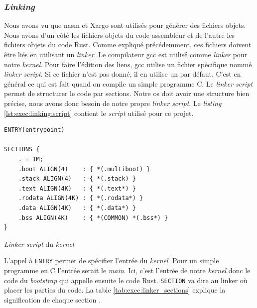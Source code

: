 \subsubsection{\textit{Linking}}
\label{linking}
Nous avons vu que \acrshort{nasm} et Xargo sont utilisés pour générer des fichiers
objets. Nous avons d'un côté les fichiers objets du code assembleur et de l'autre
les fichiers objets du code Rust. Comme expliqué précédemment,
ces fichiers doivent être liés en utilisant un \textit{linker}. Le compilateur
\acrshort{gcc} est utilisé comme \textit{linker} pour notre \textit{kernel}.
Pour faire l'édition des liens, \acrshort{gcc} utilise un fichier spécifique nommé
\textit{linker script}. Si ce fichier n'est pas donné, il en utilise un par
défaut. C'est en général ce qui est fait quand on compile un simple programme C.
Le \textit{linker script} permet de structurer le code par sections. Notre
\acrshort{os} doit avoir une structure bien précise, nous avons donc besoin de
notre propre \textit{linker script}. Le \textit{listing} \ref{lst:exec:linking:script}
contient le \textit{script} utilisé pour ce projet. \\

\begin{code}
\begin{verbatim}
ENTRY(entrypoint)

SECTIONS {
    . = 1M;
    .boot ALIGN(4)    : { *(.multiboot) }
    .stack ALIGN(4)   : { *(.stack) }
    .text ALIGN(4K)   : { *(.text*) }
    .rodata ALIGN(4K) : { *(.rodata*) }
    .data ALIGN(4K)   : { *(.data*) }
    .bss ALIGN(4K)    : { *(COMMON) *(.bss*) }
}
\end{verbatim}
\caption{\textit{Linker script} du \textit{kernel}}
\label{lst:exec:linking:script}
\end{code} \bigbreak

L'appel à \texttt{ENTRY} permet de spécifier l'entrée du \textit{kernel}.
Pour un simple programme en C l'entrée serait le \textit{main}. Ici, c'est
l'entrée de notre \textit{kernel} donc le code du \textit{bootstrap} qui appelle
ensuite le code Rust. \texttt{SECTION} va dire au linker où placer les
parties du code. La table \ref{tab:exec:linker_sections} explique la signification
de chaque section \cite{ref42,ref9,ref10,ref11}.

